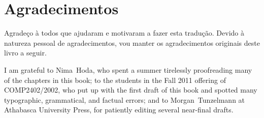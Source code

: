 \chapter*{Agradecimentos}

Agradeço à todos que ajudaram e motivaram a fazer esta tradução. Devido à natureza pessoal de agradecimentos, vou manter os agradecimentos originais deste livro a seguir.

I am grateful to Nima~Hoda, who spent a summer tirelessly proofreading
many of the chapters in this book; to the students in the Fall 2011
offering of COMP2402/2002, who put up with the first draft of this book
and spotted many typographic, grammatical, and factual errors; and to
Morgan~Tunzelmann at Athabasca University Press, for patiently editing
several near-final drafts.
